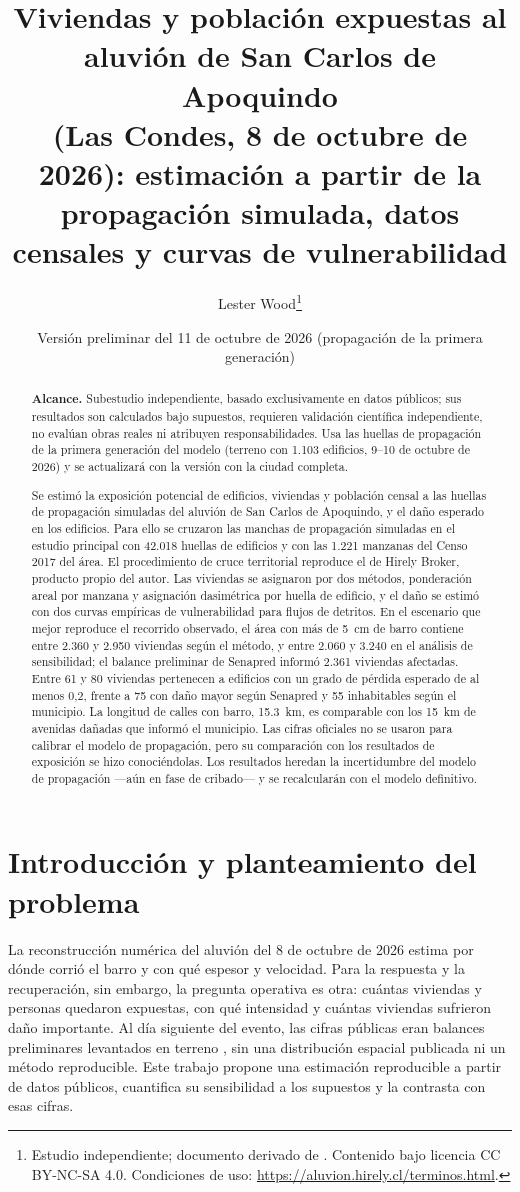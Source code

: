 \documentclass[10pt,a4paper]{article}
\title{Viviendas y población expuestas al aluvión de San Carlos de Apoquindo\\(Las Condes, 8 de octubre de 2026): estimación a partir de la\\propagación simulada, datos censales y curvas de vulnerabilidad}
\author{Lester Wood\thanks{Estudio independiente; documento derivado de \citet{wood2026}. Contenido bajo licencia CC BY-NC-SA 4.0. Condiciones de uso: \url{https://aluvion.hirely.cl/terminos.html}.}}
\date{Versión preliminar del 11 de octubre de 2026 (propagación de la primera generación)}
\begin{document}
\maketitle

\begin{abstract}
\noindent\textbf{Alcance.} Subestudio independiente, basado exclusivamente en datos públicos; sus resultados son calculados bajo supuestos, requieren validación científica independiente, no evalúan obras reales ni atribuyen responsabilidades. Usa las huellas de propagación de la primera generación del modelo (terreno con 1.103 edificios, 9--10 de octubre de 2026) y se actualizará con la versión con la ciudad completa.\par\medskip\noindent Se estimó la exposición potencial de edificios, viviendas y población censal a las huellas de propagación simuladas del aluvión de San Carlos de Apoquindo, y el daño esperado en los edificios. Para ello se cruzaron las manchas de propagación simuladas en el estudio principal con 42.018 huellas de edificios y con las 1.221 manzanas del Censo 2017 del área. El procedimiento de cruce territorial reproduce el de Hirely Broker, producto propio del autor. Las viviendas se asignaron por dos métodos, ponderación areal por manzana y asignación dasimétrica por huella de edificio, y el daño se estimó con dos curvas empíricas de vulnerabilidad para flujos de detritos. En el escenario que mejor reproduce el recorrido observado, el área con más de \SI{5}{cm} de barro contiene entre 2.360 y 2.950 viviendas según el método, y entre 2.060 y 3.240 en el análisis de sensibilidad; el balance preliminar de Senapred informó 2.361 viviendas afectadas. Entre 61 y 80 viviendas pertenecen a edificios con un grado de pérdida esperado de al menos 0,2, frente a 75 con daño mayor según Senapred y 55 inhabitables según el municipio. La longitud de calles con barro, \SI{15,3}{km}, es comparable con los \SI{15}{km} de avenidas dañadas que informó el municipio. Las cifras oficiales no se usaron para calibrar el modelo de propagación, pero su comparación con los resultados de exposición se hizo conociéndolas. Los resultados heredan la incertidumbre del modelo de propagación ---aún en fase de cribado--- y se recalcularán con el modelo definitivo.
\end{abstract}

\section{Introducción y planteamiento del problema}
La reconstrucción numérica del aluvión del 8 de octubre de 2026 \citep{wood2026} estima por dónde corrió el barro y con qué espesor y velocidad. Para la respuesta y la recuperación, sin embargo, la pregunta operativa es otra: cuántas viviendas y personas quedaron expuestas, con qué intensidad y cuántas viviendas sufrieron daño importante. Al día siguiente del evento, las cifras públicas eran balances preliminares levantados en terreno \citep{senapred2026latribuna,cnn2026balance,publimetro2026}, sin una distribución espacial publicada ni un método reproducible. Este trabajo propone una estimación reproducible a partir de datos públicos, cuantifica su sensibilidad a los supuestos y la contrasta con esas cifras.
\end{document}
